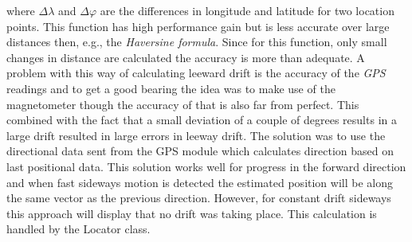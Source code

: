where $\Delta\lambda$ and $\Delta\varphi$ are the differences in longitude and latitude for two location points. This function has high performance gain but is less accurate over large distances then, e.g., the \textit{Haversine formula}\cite{haversine}. Since for this function, only small changes in distance are calculated the accuracy is more than adequate. A problem with this way of calculating leeward drift is the accuracy of the \textit{GPS} readings and to get a good bearing the idea was to make use of the magnetometer though the accuracy of that is also far from perfect. This combined with the fact that a small deviation of a couple of degrees results in a large drift resulted in large errors in leeway drift. The solution was to use the directional data sent from the GPS module which calculates direction based on last positional data. This solution works well for progress in the forward direction and when fast sideways motion is detected the estimated position will be along the same vector as the previous direction. However, for constant drift sideways this approach will display that no drift was taking place. This calculation is handled by the Locator class.

























